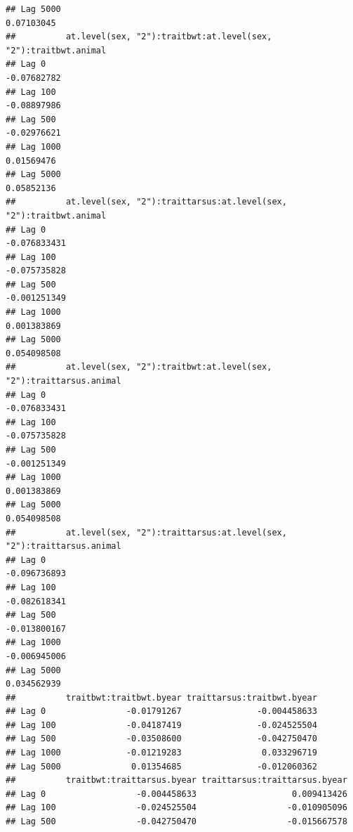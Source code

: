 \documentclass[
  12pt,
]{book}
\begin{document}
\begin{verbatim}
## Lag 5000                                                           0.07103045
##          at.level(sex, "2"):traitbwt:at.level(sex, "2"):traitbwt.animal
## Lag 0                                                       -0.07682782
## Lag 100                                                     -0.08897986
## Lag 500                                                     -0.02976621
## Lag 1000                                                     0.01569476
## Lag 5000                                                     0.05852136
##          at.level(sex, "2"):traittarsus:at.level(sex, "2"):traitbwt.animal
## Lag 0                                                         -0.076833431
## Lag 100                                                       -0.075735828
## Lag 500                                                       -0.001251349
## Lag 1000                                                       0.001383869
## Lag 5000                                                       0.054098508
##          at.level(sex, "2"):traitbwt:at.level(sex, "2"):traittarsus.animal
## Lag 0                                                         -0.076833431
## Lag 100                                                       -0.075735828
## Lag 500                                                       -0.001251349
## Lag 1000                                                       0.001383869
## Lag 5000                                                       0.054098508
##          at.level(sex, "2"):traittarsus:at.level(sex, "2"):traittarsus.animal
## Lag 0                                                            -0.096736893
## Lag 100                                                          -0.082618341
## Lag 500                                                          -0.013800167
## Lag 1000                                                         -0.006945006
## Lag 5000                                                          0.034562939
##          traitbwt:traitbwt.byear traittarsus:traitbwt.byear
## Lag 0                -0.01791267               -0.004458633
## Lag 100              -0.04187419               -0.024525504
## Lag 500              -0.03508600               -0.042750470
## Lag 1000             -0.01219283                0.033296719
## Lag 5000              0.01354685               -0.012060362
##          traitbwt:traittarsus.byear traittarsus:traittarsus.byear
## Lag 0                  -0.004458633                   0.009413426
## Lag 100                -0.024525504                  -0.010905096
## Lag 500                -0.042750470                  -0.015667578

\end{verbatim}
\end{document}
